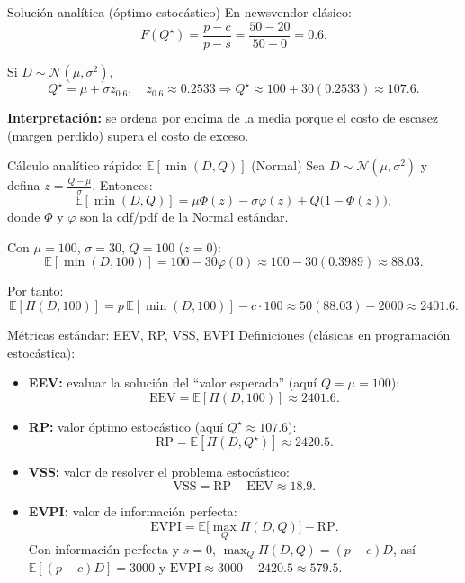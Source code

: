\documentclass[aspectratio=1610, 9pt]{beamer}
\begin{document}
\begin{frame}{Solución analítica (óptimo estocástico)}
En newsvendor clásico:
\[
F(Q^\star) = \frac{p-c}{p-s}
= \frac{50-20}{50-0}=0.6.
\]

Si $D\sim \mathcal N(\mu,\sigma^2)$,
\[
Q^\star = \mu + \sigma z_{0.6},
\quad z_{0.6}\approx 0.2533
\Rightarrow
Q^\star \approx 100 + 30(0.2533) \approx 107.6.
\]

\textbf{Interpretación:} se ordena por encima de la media porque el costo de escasez (margen perdido) supera el costo de exceso.
\end{frame}

\begin{frame}{Cálculo analítico rápido: $\mathbb E[\min(D,Q)]$ (Normal)}
Sea $D\sim \mathcal N(\mu,\sigma^2)$ y defina $z=\frac{Q-\mu}{\sigma}$.
Entonces:
\[
\mathbb E[\min(D,Q)]
= \mu \Phi(z) - \sigma \varphi(z) + Q\bigl(1-\Phi(z)\bigr),
\]
donde $\Phi$ y $\varphi$ son la cdf/pdf de la Normal estándar.

\medskip
Con $\mu=100$, $\sigma=30$, $Q=100$ ($z=0$):
\[
\mathbb E[\min(D,100)]
=100 - 30\varphi(0)
\approx 100 - 30(0.3989)\approx 88.03.
\]

Por tanto:
\[
\mathbb E[\Pi(D,100)] = p\,\mathbb E[\min(D,100)] - c\cdot 100
\approx 50(88.03) - 2000 \approx 2401.6.
\]
\end{frame}

\begin{frame}{Métricas estándar: EEV, RP, VSS, EVPI}
Definiciones (clásicas en programación estocástica):

\begin{itemize}
  \item \textbf{EEV:} evaluar la solución del ``valor esperado'' (aquí $Q=\mu=100$):
  \[
  \text{EEV}=\mathbb E[\Pi(D,100)]\approx 2401.6.
  \]
  \item \textbf{RP:} valor óptimo estocástico (aquí $Q^\star\approx107.6$):
  \[
  \text{RP}=\mathbb E[\Pi(D,Q^\star)]\approx 2420.5.
  \]
  \item \textbf{VSS:} valor de resolver el problema estocástico:
  \[
  \text{VSS}=\text{RP}-\text{EEV}\approx 18.9.
  \]
  \item \textbf{EVPI:} valor de información perfecta:
  \[
  \text{EVPI}=\mathbb E\big[\max_Q \Pi(D,Q)\big]-\text{RP}.
  \]
  Con información perfecta y $s=0$, $\max_Q \Pi(D,Q)=(p-c)D$, así
  $\mathbb E[(p-c)D]=3000$ y $\text{EVPI}\approx 3000-2420.5\approx 579.5$.
\end{itemize}
\end{frame}
\end{document}
